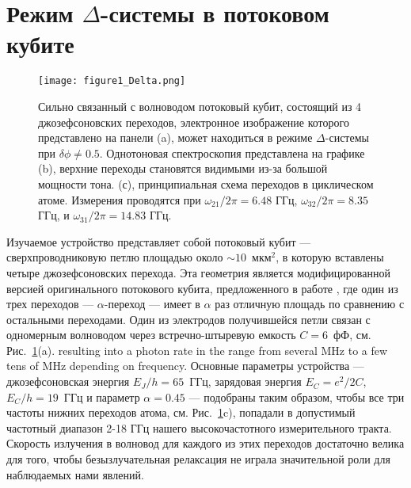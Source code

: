 \section{Режим $\Delta$-системы в потоковом кубите}
\begin{figure}
	\centering
	\texttt{[image: figure1\_Delta.png]}
	\caption[Потоковый кубит в режиме $\Delta$-системы]{Сильно связанный с волноводом потоковый кубит, состоящий из 4 джозефсоновских переходов, электронное изображение которого представлено на панели (a), может находиться в режиме $\Delta$-системы при $\delta\phi \ne 0.5$. Однотоновая спектроскопия представлена на графике (b), верхние переходы становятся видимыми из-за большой мощности тона. (с), принципиальная схема переходов в циклическом атоме. Измерения проводятся при $\omega_{21}/2\pi = 6.48$ ГГц, $\omega_{32}/2\pi = 8.35$ ГГц, и $\omega_{31}/2\pi = 14.83$ ГГц.}
	\label{fig: flux_delta}
\end{figure}
Изучаемое устройство представляет собой потоковый кубит --- сверхпроводниковую петлю площадью около $\sim 10$~мкм$^{2}$, в которую вставлены четыре джозефсоновских перехода. Эта геометрия является модифицированной версией оригинального потокового кубита, предложенного в работе \cite{mooij1999josephson}, где один из трех переходов --- $\alpha$-переход --- имеет в $\alpha$ раз отличную площадь по сравнению с остальными переходами. Один из электродов получившейся петли связан с одномерным волноводом через встречно-штыревую емкость $C=6$~фФ, см. Рис.~\ref{fig: flux_delta}(a). resulting into a photon rate in the range from several MHz to a few tens of MHz depending on frequency. Основные параметры устройства --- джозефсоновская энергия $E_{J}/h=65$~ГГц, зарядовая энергия $E_{C}=e^2/2C$, $E_{C}/h=19$~ГГц и параметр $\alpha=0.45$ --- подобраны таким образом, чтобы все три частоты нижних переходов атома, см. Рис.~\ref{fig: flux_delta}c), попадали в допустимый частотный диапазон 2-18 ГГц нашего высокочастотного измерительного тракта. Скорость излучения в волновод для каждого из этих переходов достаточно велика для того, чтобы безызлучательная релаксация не играла значительной роли для наблюдаемых нами явлений. 

